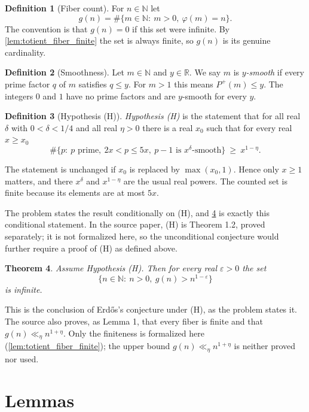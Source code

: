 \documentclass[11pt]{article}
\newtheorem{theorem}{Theorem}[section]
\theoremstyle{definition}
\newtheorem{definition}[theorem]{Definition}
\theoremstyle{remark}
\begin{document}
\begin{definition}[Fiber count]
For $n\in\mathbb{N}$ let
\[
g(n)=\#\{m\in\mathbb{N}:\ m>0,\ \varphi(m)=n\}.
\]
The convention is that $g(n)=0$ if this set were infinite. By \cref{lem:totient_fiber_finite} the set is always finite, so $g(n)$ is its genuine cardinality.
\end{definition}

\begin{definition}[Smoothness]
Let $m\in\mathbb{N}$ and $y\in\mathbb{R}$. We say $m$ is \emph{$y$-smooth} if every prime factor $q$ of $m$ satisfies $q\le y$. For $m>1$ this means $P^+(m)\le y$. The integers $0$ and $1$ have no prime factors and are $y$-smooth for every $y$.
\end{definition}

\begin{definition}[Hypothesis (H)]
\emph{Hypothesis (H)} is the statement that for all real $\delta$ with $0<\delta<1/4$ and all real $\eta>0$ there is a real $x_0$ such that for every real $x\ge x_0$
\[
\#\{p:\ p \text{ prime},\ 2x<p\le 5x,\ p-1 \text{ is } x^{\delta}\text{-smooth}\}\ \ge\ x^{1-\eta}.
\]
\end{definition}

The statement is unchanged if $x_0$ is replaced by $\max(x_0,1)$. Hence only $x\ge1$ matters, and there $x^\delta$ and $x^{1-\eta}$ are the usual real powers. The counted set is finite because its elements are at most $5x$.

The problem states the result conditionally on (H), and \cref{thm:main} is exactly this conditional statement. In the source paper, (H) is Theorem 1.2, proved separately; it is not formalized here, so the unconditional conjecture would further require a proof of (H) as defined above.

\begin{theorem}\label{thm:main}
Assume Hypothesis (H). Then for every real $\varepsilon>0$ the set
\[
\{n\in\mathbb{N}:\ n>0,\ g(n)>n^{1-\varepsilon}\}
\]
is infinite.
\end{theorem}

This is the conclusion of Erd\H{o}s's conjecture under (H), as the problem states it. The source also proves, as Lemma 1, that every fiber is finite and that $g(n)\ll_\eta n^{1+\eta}$. Only the finiteness is formalized here (\cref{lem:totient_fiber_finite}); the upper bound $g(n)\ll_\eta n^{1+\eta}$ is neither proved nor used.

\section{Lemmas}
\end{document}
